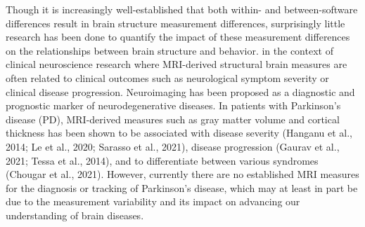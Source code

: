 \documentclass[11pt]{article}
\begin{document}
Though it is increasingly well-established that both within- and between-software differences result in brain
structure measurement differences, surprisingly little research has been done to quantify the impact of these
measurement differences on the relationships between brain structure and behavior.  in
the context of clinical neuroscience research where MRI-derived structural brain measures are often related to
clinical outcomes such as neurological symptom severity or clinical disease progression. Neuroimaging has been
proposed as a diagnostic and prognostic marker of neurodegenerative diseases. In patients with Parkinson's disease
(PD), MRI-derived measures such as gray matter volume and cortical thickness has been shown to be associated with
disease severity (Hanganu et al., 2014; Le et al., 2020; Sarasso et al., 2021), disease progression (Gaurav et
al., 2021; Tessa et al., 2014), and to differentiate between various syndromes (Chougar et al., 2021). However,
currently there are no established MRI measures for the diagnosis or tracking of Parkinson's disease, which may at
least in part be due to the measurement variability and its impact on advancing our understanding of brain
diseases.
\end{document}
